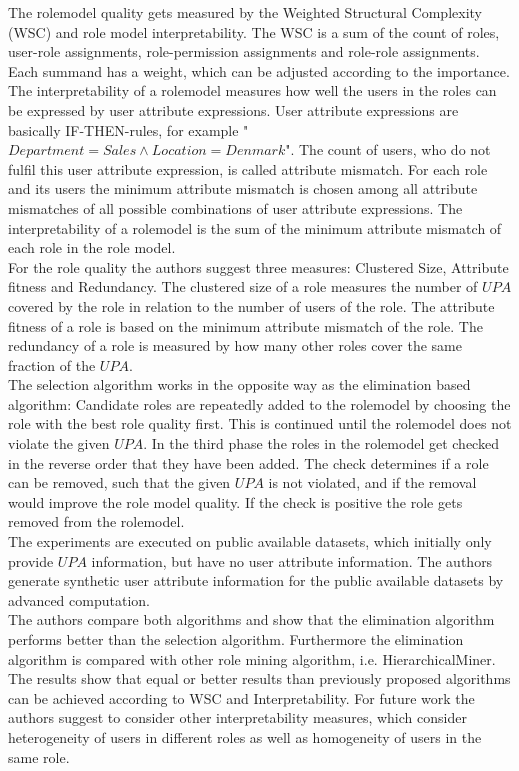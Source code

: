 The rolemodel quality gets measured by the Weighted Structural Complexity (WSC) and role model interpretability. The WSC is a sum of the count of roles, user-role assignments, role-permission assignments and role-role assignments. Each summand has a weight, which can be adjusted according to the importance. The interpretability of a rolemodel measures how well the users in the roles can be expressed by user attribute expressions. User attribute expressions are basically IF-THEN-rules, for example "$Department=Sales \wedge Location=Denmark$". The count of users, who do not fulfil this user attribute expression, is called attribute mismatch. For each role and its users the minimum attribute mismatch is chosen among all attribute mismatches of all possible combinations of user attribute expressions. The interpretability of a rolemodel is the sum of the minimum attribute mismatch of each role in the role model.\\
For the role quality the authors suggest three measures: Clustered Size, Attribute fitness and Redundancy. The clustered size of a role measures the number of $UPA$ covered by the role in relation to the number of users of the role. The attribute fitness of a role is based on the minimum attribute mismatch of the role. The redundancy of a role is measured by how many other roles cover the same fraction of the $UPA$.\\
The selection algorithm works in the opposite way as the elimination based algorithm: Candidate roles are repeatedly added to the rolemodel by choosing the role with the best role quality first. This is continued until the rolemodel does not violate the given $UPA$. In the third phase the roles in the rolemodel get checked in the reverse order that they have been added. The check determines if a role can be removed, such that the given $UPA$ is not violated, and if the removal would improve the role model quality. If the check is positive the role gets removed from the rolemodel.\\
The experiments are executed on public available datasets, which initially only provide $UPA$ information, but have no user attribute information. The authors generate synthetic user attribute information for the public available datasets by advanced computation.\\
The authors compare both algorithms and show that the elimination algorithm performs better than the selection algorithm. Furthermore the elimination algorithm is compared with other role mining algorithm, i.e. HierarchicalMiner\cite{Molloy:2010}. The results show that equal or better results than previously proposed algorithms can be achieved according to WSC and Interpretability. For future work the authors suggest to consider other interpretability measures, which consider heterogeneity of users in different roles as well as homogeneity of users in the same role.


